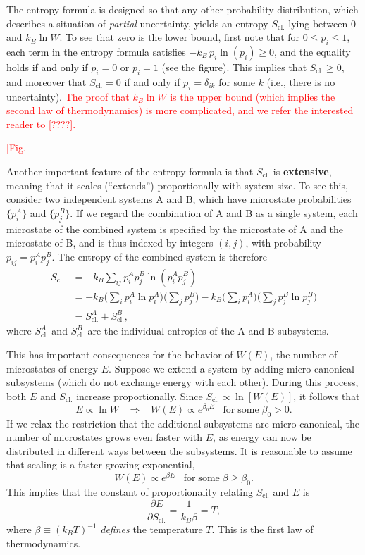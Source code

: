 \documentclass[pra,11pt]{revtex4}
\begin{document}
The entropy formula is designed so that any other probability
distribution, which describes a situation of \textit{partial}
uncertainty, yields an entropy $S_{\mathrm{cl.}}$ lying between $0$
and $k_B \ln W$.  To see that zero is the lower bound, first note that
for $0 \le p_i \le 1$, each term in the entropy formula satisfies
$-k_B\, p_i\ln(p_i) \ge 0$, and the equality holds if and only if $p_i
= 0$ or $p_i = 1$ (see the figure).  This implies that
$S_{\mathrm{cl.}}\ge 0$, and moreover that $S_{\mathrm{cl.}} = 0$ if
and only if $p_i = \delta_{ik}$ for some $k$ (i.e., there is no
uncertainty).  \textcolor{red}{The proof that $k_B \ln W$ is the upper
  bound (which implies the second law of thermodynamics) is more
  complicated, and we refer the interested reader to [????].}

\textcolor{red}{[Fig.]}

Another important feature of the entropy formula is that
$S_{\mathrm{cl.}}$ is \textbf{extensive}, meaning that it scales
(``extends'') proportionally with system size.  To see this, consider
two independent systems A and B, which have microstate probabilities
$\{p_i^A\}$ and $\{p_j^B\}$.  If we regard the combination of A and B
as a single system, each microstate of the combined system is
specified by the microstate of A and the microstate of B, and is thus
indexed by integers $(i,j)$, with probability $p_{ij} = p^A_ip^B_j$.
The entropy of the combined system is therefore
$$\begin{aligned}S_{\mathrm{cl.}} &= - k_B \sum_{ij} p_i^Ap^B_j \ln\left(p^A_ip^B_j\right) \\
  &= - k_B \Big(\sum_{i} p^A_i \ln p^A_i\Big)\Big(\sum_j p^B_j\Big)
  - k_B \Big(\sum_{i} p^A_i \Big) \Big(\sum_j p^B_j \ln p^B_j\Big) \\
  &= S_{\mathrm{cl.}}^A + S_{\mathrm{cl.}}^B,
\end{aligned}$$
where $S_{\mathrm{cl.}}^A$ and $S_{\mathrm{cl.}}^B$ are the individual
entropies of the A and B subsystems.

This has important consequences for the behavior of $W(E)$, the number
of microstates of energy $E$.  Suppose we extend a system by adding
micro-canonical subsystems (which do not exchange energy with each
other).  During this process, both $E$ and $S_{\mathrm{cl.}}$ increase
proportionally.  Since $S_{\mathrm{cl.}} \propto \ln[W(E)]$, it
follows that
$$E \propto \ln W \;\;\;\Rightarrow \;\;\;W(E) \propto e^{\beta_0 E} \;\;\; \mathrm{for\;some}\; \beta_0 > 0.$$
If we relax the restriction that the additional subsystems are
micro-canonical, the number of microstates grows even faster with $E$,
as energy can now be distributed in different ways between the
subsystems.  It is reasonable to assume that scaling is a
faster-growing exponential,
$$W(E) \propto e^{\beta E} \;\;\; \mathrm{for\;some}\; \beta \ge \beta_0.$$
This implies that the constant of proportionality relating
$S_{\mathrm{cl.}}$ and $E$ is
$$\frac{\partial E}{\partial S_{\mathrm{cl.}}} = \frac{1}{k_B \beta} = T,$$
where $\beta \equiv (k_BT)^{-1}$ \textit{defines} the temperature $T$.
This is the first law of thermodynamics.
\end{document}
